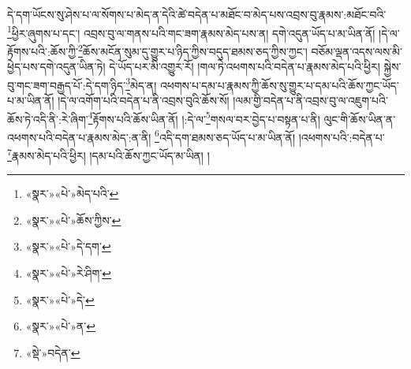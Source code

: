 དེ་དག་ཡོངས་སུ་ཤེས་པ་ལ་སོགས་པ་མེད་ན་དེའི་ཚེ་བདེན་པ་མཐོང་བ་མེད་པས་འབྲས་བུ་རྣམས་:མཐོང་བའི་\footnote{«སྣར་»«པེ་»མེད་པའི་}ཕྱིར་ཞུགས་པ་དང་། འབྲས་བུ་ལ་གནས་པའི་གང་ཟག་རྣམས་མེད་པས་ན། དགེ་འདུན་ཡོད་པ་མ་ཡིན་ནོ། །དེ་ལ་རྟོགས་པའི་:ཆོས་ཀྱི་\footnote{«སྣར་»«པེ་»ཆོས་ཀྱིས་}ཆོས་མངོན་སུམ་དུ་གྱུར་པ་ཉིད་ཀྱིས་བདུད་ཐམས་ཅད་ཀྱིས་ཀྱང་། བཅོམ་ལྡན་འདས་ལས་མི་ཕྱེད་པས་དགེ་འདུན་ཡིན་ཏེ། དེ་ཡོད་པར་མི་འགྱུར་རོ། །གལ་ཏེ་འཕགས་པའི་བདེན་པ་རྣམས་མེད་པའི་ཕྱིར། སྐྱེས་བུ་གང་ཟག་བརྒྱད་པོ་:དེ་དག་ཉིད་\footnote{«སྣར་»«པེ་»དེ་དག་}མེད་ན། འཕགས་པ་དམ་པ་རྣམས་ཀྱི་ཆོས་སུ་གྱུར་པ་དམ་པའི་ཆོས་ཀྱང་ཡོད་པ་མ་ཡིན་ནོ། །དེ་ལ་འགོག་པའི་བདེན་པ་ནི་འབྲས་བུའི་ཆོས་སོ། །ལམ་གྱི་བདེན་པ་ནི་འབྲས་བུ་ལ་འཇུག་པའི་ཆོས་ཏེ་འདི་ནི་:རེ་ཞིག་\footnote{«སྣར་»«པེ་»རེ་ཤིག་}རྟོགས་པའི་ཆོས་ཡིན་ནོ། །:དེ་ལ་\footnote{«སྣར་»«པེ་»དེ་}གསལ་བར་བྱེད་པ་བསྟན་པ་ནི། ལུང་གི་ཆོས་ཡིན་ན་འཕགས་པའི་བདེན་པ་རྣམས་མེད་:ན་ནི། \footnote{«སྣར་»«པེ་»ན་}འདི་དག་ཐམས་ཅད་ཡོད་པ་མ་ཡིན་ནོ། །འཕགས་པའི་:བདེན་པ་\footnote{«སྡེ་»བདེན་}རྣམས་མེད་པའི་ཕྱིར། །དམ་པའི་ཆོས་ཀྱང་ཡོད་མ་ཡིན། །
